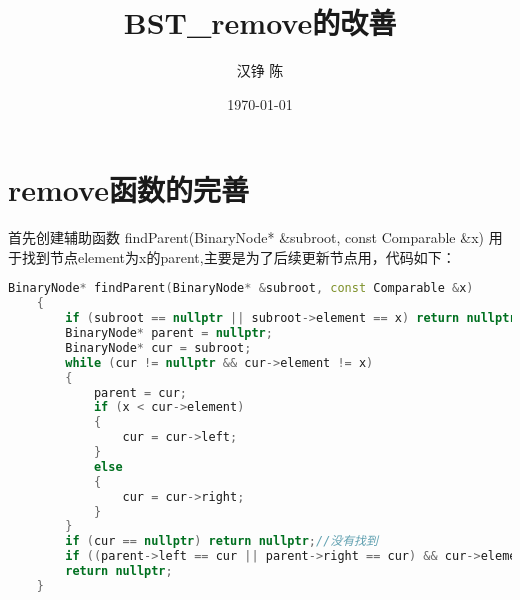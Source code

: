 \documentclass[fontset=fandol]{ctexart}
\title{BST\_remove的改善}
\author{汉铮 陈}
\date{\today}
\begin{document}
\maketitle

\section{remove函数的完善}
首先创建辅助函数 findParent(BinaryNode* \&subroot, const Comparable \&x)  用于找到节点element为x的parent,主要是为了后续更新节点用，代码如下：

\begin{lstlisting}[language=C++, caption={findParent()函数}]  
    BinaryNode* findParent(BinaryNode* &subroot, const Comparable &x)
    {
        if (subroot == nullptr || subroot->element == x) return nullptr;
        BinaryNode* parent = nullptr;
        BinaryNode* cur = subroot;
        while (cur != nullptr && cur->element != x)
        {
            parent = cur;
            if (x < cur->element)
            {
                cur = cur->left;
            }
            else
            {
                cur = cur->right;
            }
        }
        if (cur == nullptr) return nullptr;//没有找到
        if ((parent->left == cur || parent->right == cur) && cur->element == x) return parent;
        return nullptr;        
    }
\end{lstlisting}
\end{document}

